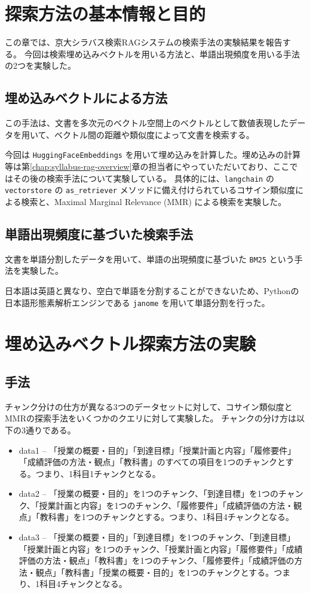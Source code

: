 \section{探索方法の基本情報と目的}
この章では、京大シラバス検索RAGシステムの検索手法の実験結果を報告する。
今回は検索埋め込みベクトルを用いる方法と、単語出現頻度を用いる手法の2つを実験した。

\subsection{埋め込みベクトルによる方法}
この手法は、文書を多次元のベクトル空間上のベクトルとして数値表現したデータを用いて、ベクトル間の距離や類似度によって文書を検索する。

今回は \texttt{HuggingFaceEmbeddings} を用いて埋め込みを計算した。埋め込みの計算等は第\ref{chap:syllabus-rag-overview}章の担当者にやっていただいており、ここではその後の検索手法について実験している。
具体的には、\texttt{langchain} の \texttt{vectorstore} の \texttt{as\_retriever} メソッドに備え付けられているコサイン類似度による検索と、Maximal Marginal Relevance (MMR) による検索を実験した。

\subsection{単語出現頻度に基づいた検索手法}
文書を単語分割したデータを用いて、単語の出現頻度に基づいた \texttt{BM25} という手法を実験した。

日本語は英語と異なり、空白で単語を分割することができないため、Pythonの日本語形態素解析エンジンである \texttt{janome} を用いて単語分割を行った。

\section{埋め込みベクトル探索方法の実験}
\subsection{手法}
チャンク分けの仕方が異なる3つのデータセットに対して、コサイン類似度とMMRの探索手法をいくつかのクエリに対して実験した。
チャンクの分け方は以下の3通りである。

\begin{itemize}
 \item data1 -- 「授業の概要・目的」「到達目標」「授業計画と内容」「履修要件」「成績評価の方法・観点」「教科書」のすべての項目を1つのチャンクとする。つまり、1科目1チャンクとなる。
 \item data2 -- 「授業の概要・目的」を1つのチャンク、「到達目標」を1つのチャンク、「授業計画と内容」を1つのチャンク、「履修要件」「成績評価の方法・観点」「教科書」を1つのチャンクとする。つまり、1科目4チャンクとなる。
 \item data3 -- 「授業の概要・目的」「到達目標」を1つのチャンク、「到達目標」「授業計画と内容」を1つのチャンク、「授業計画と内容」「履修要件」「成績評価の方法・観点」「教科書」を1つのチャンク、「履修要件」「成績評価の方法・観点」「教科書」「授業の概要・目的」を1つのチャンクとする。つまり、1科目4チャンクとなる。
\end{itemize}

